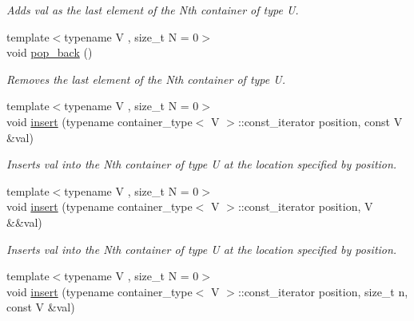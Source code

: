 \begin{DoxyCompactItemize}
\begin{DoxyCompactList}\small\item\em Adds val as the last element of the Nth container of type U. \end{DoxyCompactList}\item 
\hypertarget{classheterogeneous_1_1heterovector_3_01_t_01_4_a489be008911d021d8370d8f7a7a242df}{}{\footnotesize template$<$typename V , size\+\_\+t N = 0$>$ }\\void \hyperlink{classheterogeneous_1_1heterovector_3_01_t_01_4_a489be008911d021d8370d8f7a7a242df}{pop\+\_\+back} ()\label{classheterogeneous_1_1heterovector_3_01_t_01_4_a489be008911d021d8370d8f7a7a242df}

\begin{DoxyCompactList}\small\item\em Removes the last element of the Nth container of type U. \end{DoxyCompactList}\item 
\hypertarget{classheterogeneous_1_1heterovector_3_01_t_01_4_a8ce09231759407df90de672af5cc8bac}{}{\footnotesize template$<$typename V , size\+\_\+t N = 0$>$ }\\void \hyperlink{classheterogeneous_1_1heterovector_3_01_t_01_4_a8ce09231759407df90de672af5cc8bac}{insert} (typename container\+\_\+type$<$ V $>$\+::const\+\_\+iterator position, const V \&val)\label{classheterogeneous_1_1heterovector_3_01_t_01_4_a8ce09231759407df90de672af5cc8bac}

\begin{DoxyCompactList}\small\item\em Inserts val into the Nth container of type U at the location specified by position. \end{DoxyCompactList}\item 
\hypertarget{classheterogeneous_1_1heterovector_3_01_t_01_4_a145370fa8988e089d39f9748838aeadb}{}{\footnotesize template$<$typename V , size\+\_\+t N = 0$>$ }\\void \hyperlink{classheterogeneous_1_1heterovector_3_01_t_01_4_a145370fa8988e089d39f9748838aeadb}{insert} (typename container\+\_\+type$<$ V $>$\+::const\+\_\+iterator position, V \&\&val)\label{classheterogeneous_1_1heterovector_3_01_t_01_4_a145370fa8988e089d39f9748838aeadb}

\begin{DoxyCompactList}\small\item\em Inserts val into the Nth container of type U at the location specified by position. \end{DoxyCompactList}\item 
\hypertarget{classheterogeneous_1_1heterovector_3_01_t_01_4_afcb6ef65ff86e23ffd8f151c666039e3}{}{\footnotesize template$<$typename V , size\+\_\+t N = 0$>$ }\\void \hyperlink{classheterogeneous_1_1heterovector_3_01_t_01_4_afcb6ef65ff86e23ffd8f151c666039e3}{insert} (typename container\+\_\+type$<$ V $>$\+::const\+\_\+iterator position, size\+\_\+t n, const V \&val)\label{classheterogeneous_1_1heterovector_3_01_t_01_4_afcb6ef65ff86e23ffd8f151c666039e3}


\end{DoxyCompactItemize}
